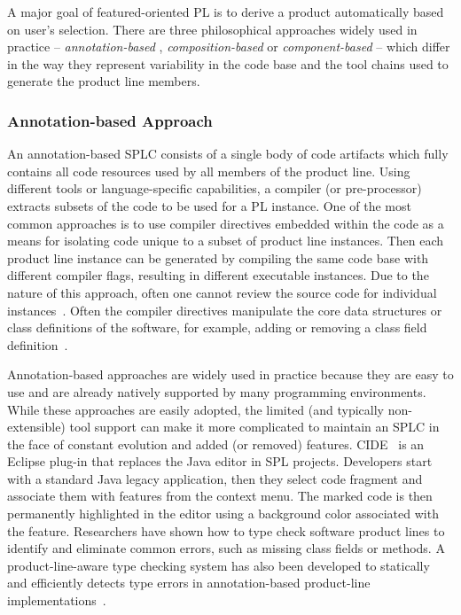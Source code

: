 A major goal of featured-oriented PL is to derive a product
automatically based on user’s selection. There are three philosophical
approaches widely used in practice -- \textit{annotation-based} ,
\textit{composition-based} or \textit{component-based} -- which differ
in the way they represent variability in the code base and the tool
chains used to generate the product line members.

\subsubsection{Annotation-based Approach}

An annotation-based SPLC consists of a single body of code artifacts
which fully contains all code resources used by all members of the
product line. Using different tools or language-specific capabilities, a
compiler (or pre-processor) extracts subsets of the code to be used for
a PL instance. One of the most common approaches is to use compiler
directives embedded within the code as a means for isolating code unique
to a subset of product line instances. Then each product line instance
can be generated by compiling the same code base with different compiler
flags, resulting in different executable instances. Due to the nature of
this approach, often one cannot review the source code for individual
instances~\cite{Apel:2013:FSP:2541773}. Often the compiler directives
manipulate the core data structures or class definitions of the
software, for example, adding or removing a class field
definition~\cite{Liebig:2010:AVF:1806799.1806819}.

Annotation-based approaches are widely used in practice because they are
easy to use and are already natively supported by many programming
environments. While these approaches are easily adopted, the limited
(and typically non-extensible) tool support can make it more complicated
to maintain an SPLC in the face of constant evolution and added (or
removed) features. CIDE~\cite{CIDE:Eclipse} is an Eclipse plug-in that
replaces the Java editor in SPL projects. Developers start with a
standard Java legacy application, then they select code fragment and
associate them with features from the context menu. The marked code is
then permanently highlighted in the editor using a background color
associated with the feature. Researchers have shown how to type check
software product lines to identify and eliminate common errors, such as
missing class fields or methods. A product-line-aware type checking
system has also been developed to statically and efficiently detects
type errors in annotation-based product-line
implementations~\cite{Kastner:2012,Apel:2013:FSP:2541773}.

